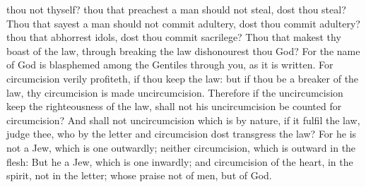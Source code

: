 {thou
not
thyself? thou that
preachest a man should
not
steal, dost thou
steal?
Thou that
sayest a man should
not commit
adultery, dost thou commit
adultery? thou that
abhorrest
idols, dost thou commit
sacrilege?
Thou
that makest thy
boast
of the
law,
through
breaking the
law dishonourest
thou
God?
For the
name of
God is
blasphemed
among the
Gentiles
through
you,
as it is
written.
For
circumcision
verily
profiteth,
if thou
keep the
law:
but
if thou
be a
breaker of the
law,
thy
circumcision is
made
uncircumcision.
Therefore
if the
uncircumcision
keep the
righteousness of the
law, shall
not
his
uncircumcision be
counted
for
circumcision?
And shall
not
uncircumcision which is
by
nature, if it
fulfil the
law,
judge
thee,
who
by the
letter
and
circumcision dost
transgress the
law?
For
he
is
not a
Jew, which is
one
outwardly;
neither
{}
circumcision, which is
outward
in the
flesh:
But
he
{} a
Jew, which is
one
inwardly;
and
circumcision
{} of the
heart,
in the
spirit,
{}
not in the
letter;
whose
praise
{}
not
of
men,
but
of
God.

}

